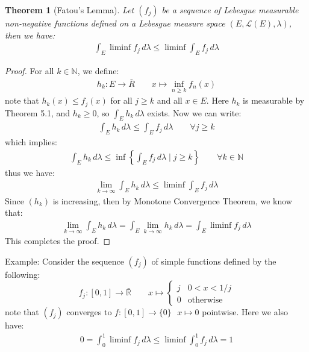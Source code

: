 \documentclass[11pt]{book}
\theoremstyle{break}
\theoremstyle{break}
\newtheorem{thm}{Theorem}[section]
\newcommand{\R}{\mathbb{R}}
\newcommand{\N}{\mathbb{N}}
\newcommand{\example}{\color{green}Example: \color{black}}
\begin{document}
\newpage
\begin{thm}[Fatou's Lemma]
Let $(f_j)$ be a sequence of Lebesgue measurable non-negative functions defined on a Lebesgue measure space $(E,\mathcal{L}(E), \lambda)$, then we have:
\begin{align*}
\int_E \liminf f_j \, d\lambda \leq \liminf \int_E f_j \, d\lambda
\end{align*}
\end{thm}
\begin{proof}
For all $k \in \N$, we define:
\begin{align*}
h_k:E\to \bar{R}\qquad x\mapsto \inf_{n \geq k}f_n(x)
\end{align*}
note that $h_k(x) \leq f_j(x)$ for all $j \geq k$ and all $x \in E$. Here $h_k$ is measurable by Theorem 5.1, and $h_k \geq 0$, so $\int_E h_k\, d\lambda$ exists. Now we can write:
\begin{align*}
\int_E h_k \, d\lambda \leq \int_E f_j \, d\lambda \qquad \forall j \geq k
\end{align*}
which implies:
\begin{align*}
\int_E h_k \, d\lambda \leq \inf\left\{\int_E f_j \, d\lambda\mid j \geq k\right\} \qquad \forall k \in \N
\end{align*}
thus we have:
\begin{align*}
\lim_{k\to \infty}\int_E h_k\, d\lambda \leq \liminf \int_E f_j \, d\lambda
\end{align*}
Since $(h_k)$ is increasing, then by Monotone Convergence Theorem, we know that:
\begin{align*}
\lim_{k\to \infty} \int_E h_k \, d\lambda = \int_{E} \lim_{k\to \infty} h_k\, d\lambda = \int_E \liminf f_j \, d\lambda
\end{align*}
This completes the proof.
\end{proof}
\hfill\break

\example
Consider the sequence $(f_j)$ of simple functions defined by the following: 
$$f_j:[0,1]\to \bar{\R} \qquad x\mapsto \begin{cases}
j & 0<x<1/j\\
0 & \text{otherwise}
\end{cases}$$
note that $(f_j)$ converges to $f:[0,1]\to \{0\} \ \ \ x\mapsto 0$ pointwise. Here we also have:
\begin{align*}
0 = \int_0^1 \liminf f_j \, d\lambda \leq \liminf \int_0^1 f_j \, d\lambda = 1
\end{align*}

\hfill\break
\hfill\break
\end{document}
